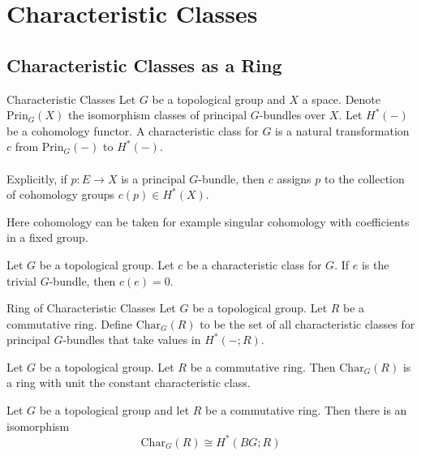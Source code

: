 \documentclass[a4paper]{article}
\begin{document}
\pagebreak
\section{Characteristic Classes}
\subsection{Characteristic Classes as a Ring}
\begin{defn}{Characteristic Classes}{} Let $G$ be a topological group and $X$ a space. Denote $\text{Prin}_G(X)$ the isomorphism classes of principal $G$-bundles over $X$. Let $H^\ast(-)$ be a cohomology functor. A characteristic class for $G$ is a natural transformation $c$ from $\text{Prin}_G(-)$ to $H^\ast(-)$. \\~\\

Explicitly, if $p:E\to X$ is a principal $G$-bundle, then $c$ assigns $p$ to the collection of cohomology groups $c(p)\in H^\ast(X)$. 
\end{defn}

Here cohomology can be taken for example singular cohomology with coefficients in a fixed group. 

\begin{lmm}{}{} Let $G$ be a topological group. Let $c$ be a characteristic class for $G$. If $e$ is the trivial $G$-bundle, then $c(e)=0$. 
\end{lmm}

\begin{defn}{Ring of Characteristic Classes}{} Let $G$ be a topological group. Let $R$ be a commutative ring. Define $\text{Char}_G(R)$ to be the set of all characteristic classes for principal $G$-bundles that take values in $H^\ast(-;R)$. 
\end{defn}

\begin{prp}{}{} Let $G$ be a topological group. Let $R$ be a commutative ring. Then $\text{Char}_G(R)$ is a ring with unit the constant characteristic class. 
\end{prp}

\begin{thm}{}{} Let $G$ be a topological group and let $R$ be a commutative ring. Then there is an isomorphism $$\text{Char}_G(R)\cong H^\ast(BG;R)$$
\end{thm}
\end{document}
